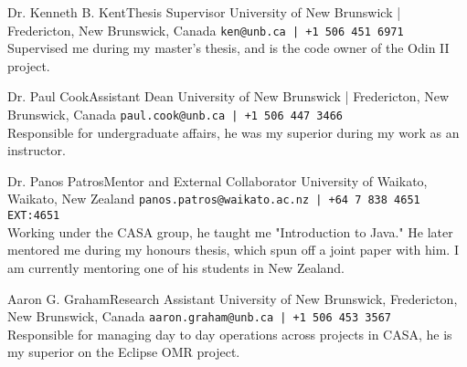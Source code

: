 \documentclass[9.5pt]{developercv} %
\begin{document}
\begin{entrylist}

    \entry%
        {Dr. Kenneth B. Kent}{Thesis Supervisor}
        {University of New Brunswick | Fredericton, New Brunswick, Canada}
        {\texttt{ken@unb.ca | +1 506 451 6971}\\
            Supervised me during my master's thesis, and is the code owner of the Odin II project.
            }

    \entry%
        {Dr. Paul Cook}{Assistant Dean}
        {University of New Brunswick | Fredericton, New Brunswick, Canada}
        {\texttt{paul.cook@unb.ca | +1 506 447 3466}\\
            Responsible for undergraduate affairs, he was my superior during my work as an instructor.
            }


    \entry%
        {Dr. Panos Patros}{Mentor and External Collaborator}
        {University of Waikato, Waikato, New Zealand}
        {\texttt{panos.patros@waikato.ac.nz | +64 7 838 4651 EXT:4651}\\
            Working under the CASA group, he taught me "Introduction to Java."
            He later mentored me during my honours thesis, which spun off a joint paper with him.
            I am currently mentoring one of his students in New Zealand.
            }

    \entry%
        {Aaron G. Graham}{Research Assistant}
        {University of New Brunswick, Fredericton, New Brunswick, Canada}
        {\texttt{aaron.graham@unb.ca | +1 506 453 3567}\\
            Responsible for managing day to day operations across projects in CASA, he is my superior on the Eclipse OMR project.
            }

\end{entrylist}
\end{document}
